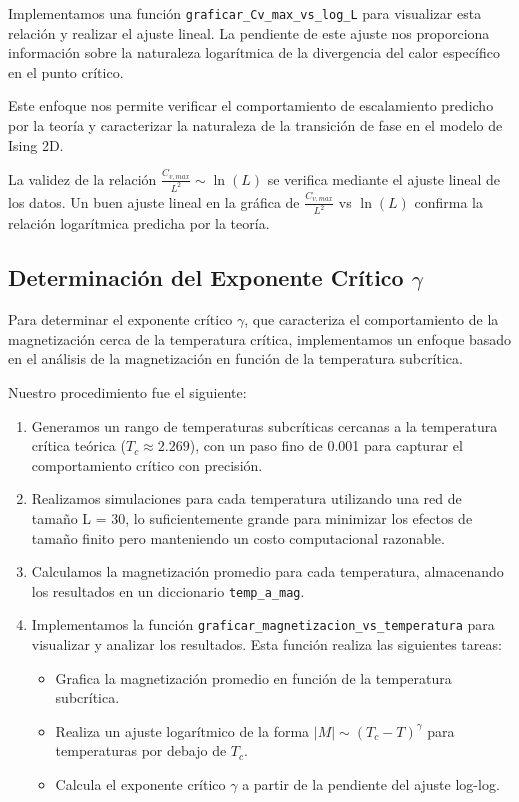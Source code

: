 \documentclass[twocolumn]{article}
\begin{document}
Implementamos una función \texttt{graficar\_Cv\_max\_vs\_log\_L} para visualizar esta relación y realizar el ajuste lineal. La pendiente de este ajuste nos proporciona información sobre la naturaleza logarítmica de la divergencia del calor específico en el punto crítico.

Este enfoque nos permite verificar el comportamiento de escalamiento predicho por la teoría y caracterizar la naturaleza de la transición de fase en el modelo de Ising 2D.

La validez de la relación $\frac{C_{v,max}}{L^2} \sim \ln(L)$ se verifica mediante el ajuste lineal de los datos. Un buen ajuste lineal en la gráfica de $\frac{C_{v,max}}{L^2}$ vs $\ln(L)$ confirma la relación logarítmica predicha por la teoría. 

\subsection*{Determinación del Exponente Crítico $\gamma$}

Para determinar el exponente crítico $\gamma$, que caracteriza el comportamiento de la magnetización cerca de la temperatura crítica, implementamos un enfoque basado en el análisis de la magnetización en función de la temperatura subcrítica.

Nuestro procedimiento fue el siguiente:

\begin{enumerate}
    \item Generamos un rango de temperaturas subcríticas cercanas a la temperatura crítica teórica ($T_c \approx 2.269$), con un paso fino de 0.001 para capturar el comportamiento crítico con precisión.
    
    \item Realizamos simulaciones para cada temperatura utilizando una red de tamaño L = 30, lo suficientemente grande para minimizar los efectos de tamaño finito pero manteniendo un costo computacional razonable.
    
    \item Calculamos la magnetización promedio para cada temperatura, almacenando los resultados en un diccionario \texttt{temp\_a\_mag}.
    
    \item Implementamos la función \texttt{graficar\_magnetizacion\_vs\_temperatura} para visualizar y analizar los resultados. Esta función realiza las siguientes tareas:
    \begin{itemize}
        \item Grafica la magnetización promedio en función de la temperatura subcrítica.
        \item Realiza un ajuste logarítmico de la forma $|M| \sim (T_c - T)^\gamma$ para temperaturas por debajo de $T_c$.
        \item Calcula el exponente crítico $\gamma$ a partir de la pendiente del ajuste log-log.
    \end{itemize}
\end{enumerate}
\end{document}
